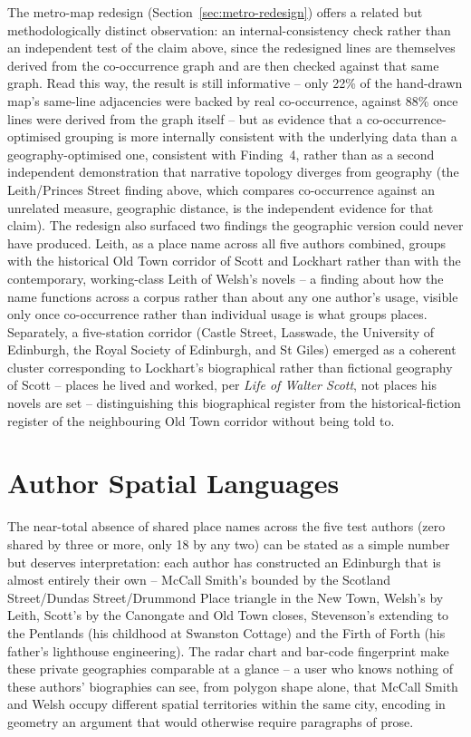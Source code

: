 \documentclass[logo,msc]{infthesis}
\begin{document}
The metro-map redesign (Section~\ref{sec:metro-redesign}) offers a related but methodologically distinct observation: an internal-consistency check rather than an independent test of the claim above, since the redesigned lines are themselves derived from the co-occurrence graph and are then checked against that same graph. Read this way, the result is still informative -- only 22\% of the hand-drawn map's same-line adjacencies were backed by real co-occurrence, against 88\% once lines were derived from the graph itself -- but as evidence that a co-occurrence-optimised grouping is more internally consistent with the underlying data than a geography-optimised one, consistent with Finding~4, rather than as a second independent demonstration that narrative topology diverges from geography (the Leith/Princes Street finding above, which compares co-occurrence against an unrelated measure, geographic distance, is the independent evidence for that claim). The redesign also surfaced two findings the geographic version could never have produced. Leith, as a place name across all five authors combined, groups with the historical Old Town corridor of Scott and Lockhart rather than with the contemporary, working-class Leith of Welsh's novels -- a finding about how the name functions across a corpus rather than about any one author's usage, visible only once co-occurrence rather than individual usage is what groups places. Separately, a five-station corridor (Castle Street, Lasswade, the University of Edinburgh, the Royal Society of Edinburgh, and St Giles) emerged as a coherent cluster corresponding to Lockhart's biographical rather than fictional geography of Scott -- places he lived and worked, per \textit{Life of Walter Scott}, not places his novels are set -- distinguishing this biographical register from the historical-fiction register of the neighbouring Old Town corridor without being told to.

\section{Author Spatial Languages}
 
The near-total absence of shared place names across the five test authors (zero shared by three or more, only 18 by any two) can be stated as a simple number but deserves interpretation: each author has constructed an Edinburgh that is almost entirely their own -- McCall Smith's bounded by the Scotland Street/Dundas Street/Drummond Place triangle in the New Town, Welsh's by Leith, Scott's by the Canongate and Old Town closes, Stevenson's extending to the Pentlands (his childhood at Swanston Cottage) and the Firth of Forth (his father's lighthouse engineering). The radar chart and bar-code fingerprint make these private geographies comparable at a glance -- a user who knows nothing of these authors' biographies can see, from polygon shape alone, that McCall Smith and Welsh occupy different spatial territories within the same city, encoding in geometry an argument that would otherwise require paragraphs of prose.
\end{document}
